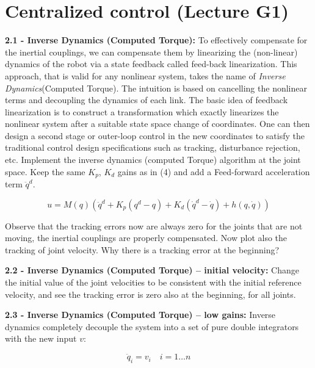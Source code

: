 \documentclass[11pt]{article}
\begin{document}
\quad

\section{Centralized control (Lecture G1)}

\noindent
\textbf{2.1 - Inverse Dynamics (Computed Torque):}
To effectively compensate for the inertial couplings, we can compensate them by 
linearizing the (non-linear) dynamics of the robot via a state feedback called feed-back linearization. This approach, that is valid for any nonlinear system, takes the name of \textit{Inverse Dynamics}(Computed Torque). 
The intuition is based on cancelling the nonlinear terms and decoupling the dynamics of each link.
The basic idea of feedback linearization is to construct a transformation which exactly linearizes the
nonlinear system after a suitable state space change of coordinates. One can then design a second stage or
outer-loop control in the new coordinates to satisfy the traditional control design specifications such as tracking,
disturbance rejection, etc.
Implement the inverse dynamics  (computed Torque) algorithm at the joint space. Keep the same $K_p$, $K_d$ gains as in (4) and add a Feed-forward acceleration term $\ddot{q}^d$. 

\begin{equation*}
u = M(q) (\ddot{q}^d + K_{p} (q^d  - q) + K_{d} (\dot{q}^d  - \dot{q}) + h(q,\dot{q}))
\end{equation*}

Observe that the tracking errors  now are  always zero for the joints that are not moving, 
the inertial couplings are properly compensated. 
Now plot also the tracking of joint velocity. Why there is a tracking error at the beginning? 

\quad

\noindent
\textbf{ 2.2 - Inverse Dynamics (Computed Torque) – initial velocity:}
Change the initial value of the joint velocities to be consistent with the initial reference velocity, and see the tracking error is zero also at the beginning, for all joints. 

\quad

\noindent
\textbf{ 2.3 - Inverse Dynamics (Computed Torque) – low gains:}
Inverse dynamics completely decouple the system into a set of pure double integrators with the new input $v$:

\begin{equation*}
\ddot{q}_i = v_i  \quad i = 1 \dots n
\end{equation*}
\end{document}
